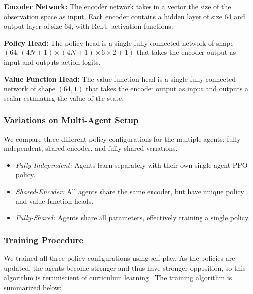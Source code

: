 \documentclass[12pt, a4paper, twocolumn]{article}
\begin{document}
\textbf{Encoder Network:} The encoder network takes in a vector the size of the observation space as input. Each encoder contains a hidden layer of size 64 and output layer of size 64, with ReLU activation functions.

\textbf{Policy Head:} The policy head is a single fully connected network of shape $(64, (4N + 1) \times (4N + 1) \times 6 \times 2 + 1)$ that takes the encoder output as input and outputs action logits.

\textbf{Value Function Head:} The value function head is a single fully connected network of shape $(64, 1)$ that takes the encoder output as input and outputs a scalar estimating the value of the state.

\subsubsection{Variations on Multi-Agent Setup}

We compare three different policy configurations for the multiple agents: fully-independent, shared-encoder, and fully-shared variations.
\begin{itemize}
  \item \textit{Fully-Independent:} Agents learn separately with their own single-agent PPO policy. 
  \item \textit{Shared-Encoder:} All agents share the same encoder, but have unique policy and value function heads.
  \item \textit{Fully-Shared:} Agents share all parameters, effectively training a single policy.
\end{itemize}

\subsubsection{Training Procedure}

We trained all three policy configurations using self-play. As the policies are updated, the agents become stronger and thus have stronger opposition, so this algorithm is reminiscient of curriculum learning \cite{SelfPlayCurriculumLearning}. The training algorithm is summarized below:


\end{document}
